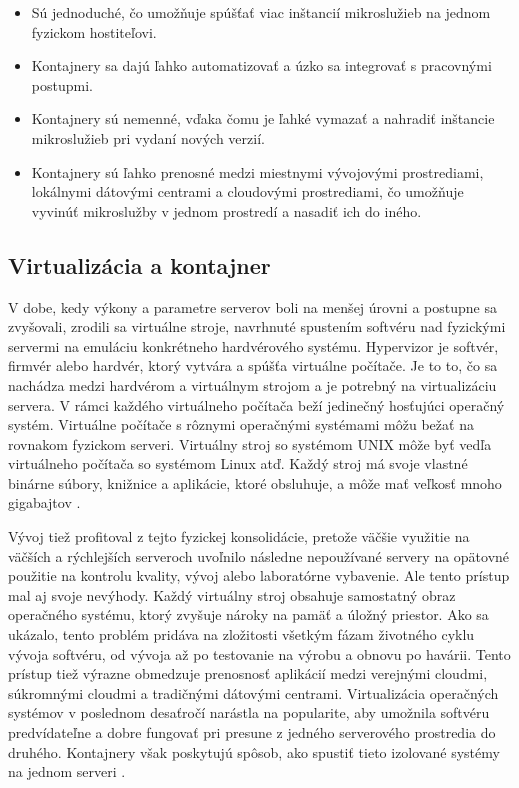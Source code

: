\begin{itemize}
\item Sú jednoduché, čo umožňuje spúšťať viac inštancií mikroslužieb na jednom fyzickom hostiteľovi.
\item Kontajnery sa dajú ľahko automatizovať a úzko sa integrovať s pracovnými postupmi.
\item Kontajnery sú nemenné, vďaka čomu je ľahké vymazať a nahradiť inštancie mikroslužieb pri vydaní nových verzií.
\item Kontajnery sú ľahko prenosné medzi miestnymi vývojovými prostrediami, lokálnymi dátovými centrami a cloudovými prostrediami, čo umožňuje vyvinúť mikroslužby v jednom prostredí a nasadiť ich do iného.
\end{itemize}

\subsection{Virtualizácia a kontajner}

V dobe, kedy výkony a parametre serverov boli na menšej úrovni a postupne sa zvyšovali, zrodili sa virtuálne stroje, navrhnuté spustením softvéru nad fyzickými servermi na emuláciu konkrétneho hardvérového systému. Hypervizor je softvér, firmvér alebo hardvér, ktorý vytvára a spúšťa virtuálne počítače. Je to to, čo sa nachádza medzi hardvérom a virtuálnym strojom a je potrebný na virtualizáciu servera. V rámci každého virtuálneho počítača beží jedinečný hosťujúci operačný systém. Virtuálne počítače s rôznymi operačnými systémami môžu bežať na rovnakom fyzickom serveri. Virtuálny stroj so systémom UNIX môže byť vedľa virtuálneho počítača so systémom Linux atď. Každý stroj má svoje vlastné binárne súbory, knižnice a aplikácie, ktoré obsluhuje, a môže mať veľkosť mnoho gigabajtov \cite{containersvsvirtual1}.

Vývoj tiež profitoval z tejto fyzickej konsolidácie, pretože väčšie využitie na väčších a rýchlejších serveroch uvoľnilo následne nepoužívané servery na opätovné použitie na kontrolu kvality, vývoj alebo laboratórne vybavenie. Ale tento prístup mal aj svoje nevýhody. Každý virtuálny stroj obsahuje samostatný obraz operačného systému, ktorý zvyšuje nároky na pamäť a úložný priestor. Ako sa ukázalo, tento problém pridáva na zložitosti všetkým fázam životného cyklu vývoja softvéru, od vývoja až po testovanie na výrobu a obnovu po havárii. Tento prístup tiež výrazne obmedzuje prenosnosť aplikácií medzi verejnými cloudmi, súkromnými cloudmi a tradičnými dátovými centrami. Virtualizácia operačných systémov v poslednom desaťročí narástla na popularite, aby umožnila softvéru predvídateľne a dobre fungovať pri presune z jedného serverového prostredia do druhého. Kontajnery však poskytujú spôsob, ako spustiť tieto izolované systémy na jednom serveri \cite{containersvsvirtual2}.

